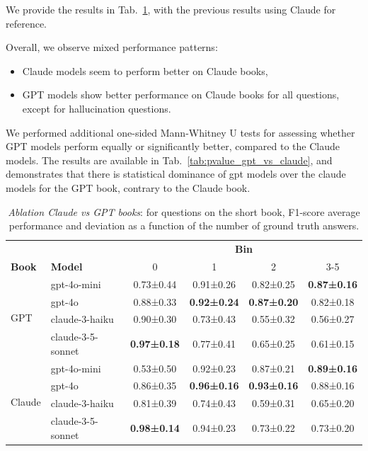 \documentclass{article}
\begin{document}
We provide the results in Tab.~\ref{tab:results_20_get_all_questions_ablation_gpt_vs_claude}, with the previous results using Claude for reference.



Overall, we observe mixed performance patterns:
\begin{itemize}
 \item Claude models seem to perform better on Claude books,
 \item GPT models show better performance on Claude books for all questions, except for hallucination questions.
\end{itemize}

We performed additional one-sided Mann-Whitney U tests for assessing whether GPT models perform equally or significantly better, compared to the Claude models. The results are available in Tab.~\ref{tab:pvalue_gpt_vs_claude}, and demonstrates that there is statistical dominance of gpt models over the claude models for the GPT book, contrary to the Claude book.

\begin{table}[htbp]
\caption{\textit{Ablation Claude vs GPT books}: for questions on the short book, F1-score average performance and deviation as a function of the number of ground truth answers.}
\label{tab:results_20_get_all_questions_ablation_gpt_vs_claude}
\centering
\begin{tabular}{@{}llcccc@{}}
\toprule
      & & \multicolumn{4}{c}{\bf Bin}\\
 \bf Book & \bf Model & 0 & 1 & 2 & 3-5 \\ \midrule
\multirow{4}{*}{GPT} & gpt-4o-mini & 0.73±0.44 & 0.91±0.26 & 0.82±0.25 & \textbf{0.87±0.16} \\
 & gpt-4o & 0.88±0.33                          & \textbf{0.92±0.24} & \textbf{0.87±0.20} & 0.82±0.18 \\
 & claude-3-haiku & 0.90±0.30                  & 0.73±0.43 & 0.55±0.32 & 0.56±0.27 \\
 & claude-3-5-sonnet & \textbf{0.97±0.18}      & 0.77±0.41 & 0.65±0.25 & 0.61±0.15 \\ \midrule
 \multirow{4}{*}{Claude} & gpt-4o-mini & 0.53±0.50 & 0.92±0.23 & 0.87±0.21 & \textbf{0.89±0.16} \\
 & gpt-4o & 0.86±0.35 & \textbf{0.96±0.16} & \textbf{0.93±0.16} & 0.88±0.16 \\
 & claude-3-haiku & 0.81±0.39 & 0.74±0.43 & 0.59±0.31 & 0.65±0.20 \\
 & claude-3-5-sonnet & \textbf{0.98±0.14} & 0.94±0.23 & 0.73±0.22 & 0.73±0.20 \\ \bottomrule
\end{tabular}
\end{table}
\end{document}

